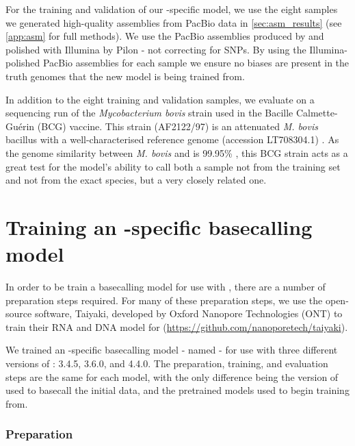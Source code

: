 For the training and validation of our \mtb{}-specific model, we use the eight samples we generated high-quality assemblies from PacBio data in \autoref{sec:asm_results} (see \autoref{app:asm} for full methods). We use the PacBio assemblies produced by \flye{} and polished with Illumina by Pilon - not correcting for SNPs. By using the Illumina-polished PacBio assemblies for each sample we ensure no \ont{} biases are present in the truth genomes that the new model is being trained from.

In addition to the eight training and validation samples, we evaluate on a \ont{} sequencing run of the \textit{Mycobacterium bovis} strain used in the Bacille Calmette-Guérin (BCG) vaccine. This strain (AF2122/97) is an attenuated \textit{M. bovis} bacillus \cite{luca2013} with a well-characterised reference genome (accession LT708304.1) \cite{Malone2017}. As the genome similarity between \textit{M. bovis} and \mtb{} is 99.95\% \cite{Kanipe2020}, this BCG strain acts as a great test for the model's ability to call both a sample not from the training set and not from the exact species, but a very closely related one.


\section{Training an \mtb{}-specific \ont{} basecalling model}

In order to be train a basecalling model for use with \guppy{}, there are a number of preparation steps required. For many of these preparation steps, we use the open-source software, Taiyaki, developed by Oxford Nanopore Technologies (ONT) to train their RNA and DNA model for \guppy{} (\url{https://github.com/nanoporetech/taiyaki}).

We trained an \mtb{}-specific basecalling model - named \tubby{} - for use with three different versions of \guppy{}: 3.4.5, 3.6.0, and 4.4.0. The preparation, training, and evaluation steps are the same for each model, with the only difference being the version of \guppy{} used to basecall the initial data, and the pretrained models used to begin training from.

\subsubsection{Preparation}

